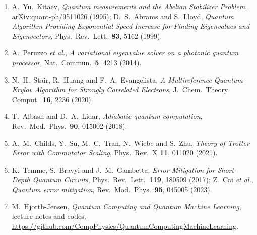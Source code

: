 \documentclass[12pt,a4paper]{article}
\begin{document}
\begin{enumerate}
    \item A.~Yu.~Kitaev, \textit{Quantum measurements and the Abelian Stabilizer Problem}, arXiv:quant-ph/9511026 (1995); D.~S.~Abrams and S.~Lloyd, \textit{Quantum Algorithm Providing Exponential Speed Increase for Finding Eigenvalues and Eigenvectors}, Phys.\ Rev.\ Lett.\ \textbf{83}, 5162 (1999).
    \item A.~Peruzzo \textit{et al.}, \textit{A variational eigenvalue solver on a photonic quantum processor}, Nat.\ Commun.\ \textbf{5}, 4213 (2014).
    \item N.~H.~Stair, R.~Huang and F.~A.~Evangelista, \textit{A Multireference Quantum Krylov Algorithm for Strongly Correlated Electrons}, J.\ Chem.\ Theory Comput.\ \textbf{16}, 2236 (2020).
    \item T.~Albash and D.~A.~Lidar, \textit{Adiabatic quantum computation}, Rev.\ Mod.\ Phys.\ \textbf{90}, 015002 (2018).
    \item A.~M.~Childs, Y.~Su, M.~C.~Tran, N.~Wiebe and S.~Zhu, \textit{Theory of Trotter Error with Commutator Scaling}, Phys.\ Rev.\ X \textbf{11}, 011020 (2021).
    \item K.~Temme, S.~Bravyi and J.~M.~Gambetta, \textit{Error Mitigation for Short-Depth Quantum Circuits}, Phys.\ Rev.\ Lett.\ \textbf{119}, 180509 (2017); Z.~Cai \textit{et al.}, \textit{Quantum error mitigation}, Rev.\ Mod.\ Phys.\ \textbf{95}, 045005 (2023).
    \item M.~Hjorth-Jensen, \textit{Quantum Computing and Quantum Machine Learning}, lecture notes and codes,\\ \url{https://github.com/CompPhysics/QuantumComputingMachineLearning}.
\end{enumerate}
\end{document}

